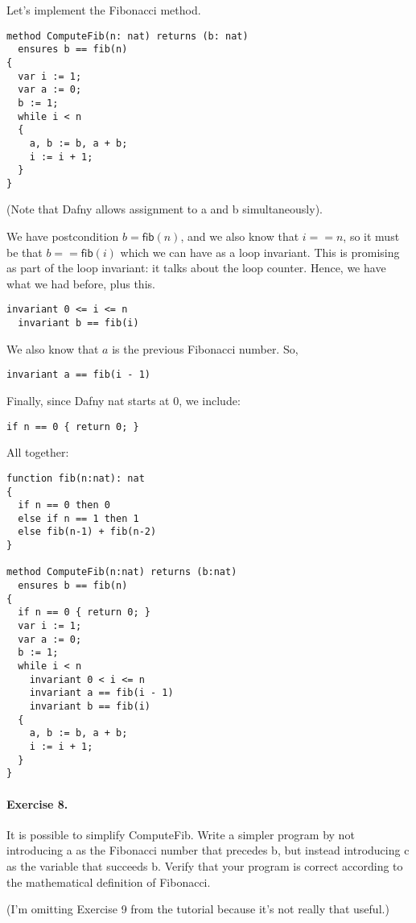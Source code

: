 \documentclass[11pt]{article}
\begin{document}
Let's implement the Fibonacci method.
\begin{lstlisting}[language=dafny]
method ComputeFib(n: nat) returns (b: nat)
  ensures b == fib(n)
{
  var i := 1;
  var a := 0;
  b := 1;
  while i < n
  {
    a, b := b, a + b;
    i := i + 1;
  }
}
\end{lstlisting}
(Note that Dafny allows assignment to \textsf{a} and \textsf{b} simultaneously).

We have postcondition $b = \mathsf{fib}(n)$, and we also know
that $i == n$, so it must be that $b == \mathsf{fib}(i)$ which we can have as a loop invariant. This
is promising as part of the loop invariant: it talks about the loop counter. Hence, we have what we had before,
plus this.
\begin{lstlisting}[language=dafny]
  invariant 0 <= i <= n
  invariant b == fib(i)
\end{lstlisting}
We also know that $a$ is the previous Fibonacci number. So,
\begin{lstlisting}[language=dafny]
  invariant a == fib(i - 1)
\end{lstlisting}
Finally, since Dafny \textsf{nat} starts at 0, we include:
\begin{lstlisting}[language=dafny]
  if n == 0 { return 0; }
\end{lstlisting}
All together:
\begin{lstlisting}[language=dafny]
function fib(n:nat): nat
{
  if n == 0 then 0
  else if n == 1 then 1
  else fib(n-1) + fib(n-2)
}

method ComputeFib(n:nat) returns (b:nat)
  ensures b == fib(n)
{
  if n == 0 { return 0; }
  var i := 1;
  var a := 0;
  b := 1;
  while i < n
    invariant 0 < i <= n
    invariant a == fib(i - 1)
    invariant b == fib(i)
  {
    a, b := b, a + b;
    i := i + 1;
  }
}
\end{lstlisting}


\paragraph{Exercise 8.} It is possible to simplify \textsf{ComputeFib}.
Write a simpler program by not introducing \textsf{a} as the Fibonacci number
that precedes \textsf{b}, but instead introducing \textsf{c} as the variable that
succeeds \textsf{b}. Verify that your program is correct according to the mathematical
definition of Fibonacci.

(I'm omitting Exercise 9 from the tutorial because it's not really that useful.)
\end{document}

